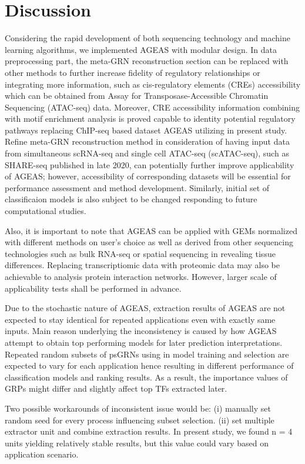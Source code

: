 \documentclass[fleqn,10pt]{wlscirep}
\begin{document}
\section*{Discussion}
  \label{disc}
  Considering the rapid development of both sequencing technology and machine learning algorithms, we implemented AGEAS with modular design.
  In data preprocessing part, the meta-GRN reconstruction section can be replaced with other methods to further increase fidelity of regulatory relationships or integrating more information, such as cis-regulatory elements (CREs) accessibility which can be obtained from Assay for Transposase-Accessible Chromatin Sequencing (ATAC-seq) data.
  Moreover, CRE accessibility information combining with motif enrichment analysis is proved capable to identity potential regulatory pathways replacing ChIP-seq based dataset AGEAS utilizing in present study. \cite{scREMOTE}
  Refine meta-GRN reconstruction method in consideration of having input data from simultaneous scRNA-seq and single cell ATAC-seq (scATAC-seq), such as SHARE-seq published in late 2020, \cite{share_seq} can potentially further improve applicability of AGEAS; however, accessibility of corresponding datasets will be essential for performance assessment and method development.
  Similarly, initial set of classificaion models is also subject to be changed responding to future computational studies.

  Also, it is important to note that AGEAS can be applied with GEMs normalized with different methods on user's choice as well as derived from other sequencing technologies such as bulk RNA-seq or spatial sequencing in revealing tissue differences.
  Replacing transcriptiomic data with proteomic data may also be achievable to analysis protein interaction networks.
  However, larger scale of applicability tests shall be performed in advance.

  Due to the stochastic nature of AGEAS, extraction results of AGEAS are not expected to stay identical for repeated applications even with exactly same inputs.
  Main reason underlying the inconsistency is caused by how AGEAS attempt to obtain top performing models for later prediction interpretations.
  Repeated random subsets of psGRNs using in model training and selection are expected to vary for each application hence resulting in different performance of classification models and ranking results.
  As a result, the importance values of GRPs might differ and slightly affect top TFs extracted later.

  Two possible workarounds of inconsistent issue would be:
  (i) manually set random seed for every process influencing subset selection.
  (ii) set multiple extractor unit and combine extraction results.
  In present study, we found n = 4 units yielding relatively stable results, but this value could vary based on application scenario.
\end{document}
